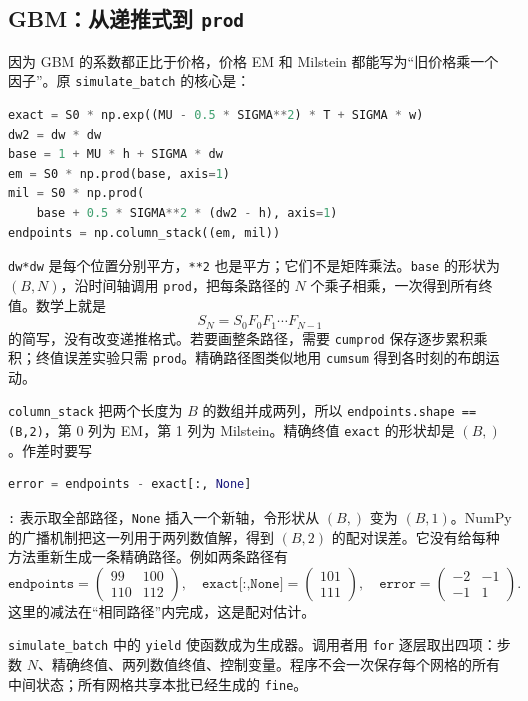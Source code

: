 \documentclass[11pt,a4paper,fontset=none]{ctexart}
\numberwithin{equation}{section}
\begin{document}
\subsection{GBM：从递推式到 \texttt{prod}}

因为 GBM 的系数都正比于价格，价格 EM 和 Milstein 都能写为“旧价格乘一个因子”。原 \texttt{simulate\_batch} 的核心是：
\begin{lstlisting}[language=Python]
exact = S0 * np.exp((MU - 0.5 * SIGMA**2) * T + SIGMA * w)
dw2 = dw * dw
base = 1 + MU * h + SIGMA * dw
em = S0 * np.prod(base, axis=1)
mil = S0 * np.prod(
    base + 0.5 * SIGMA**2 * (dw2 - h), axis=1)
endpoints = np.column_stack((em, mil))
\end{lstlisting}
\texttt{dw*dw} 是每个位置分别平方，\texttt{**2} 也是平方；它们不是矩阵乘法。\texttt{base} 的形状为 $(B,N)$，沿时间轴调用 \texttt{prod}，把每条路径的 $N$ 个乘子相乘，一次得到所有终值。数学上就是
\[
S_N=S_0F_0F_1\cdots F_{N-1}
\]
的简写，没有改变递推格式。若要画整条路径，需要 \texttt{cumprod} 保存逐步累积乘积；终值误差实验只需 \texttt{prod}。精确路径图类似地用 \texttt{cumsum} 得到各时刻的布朗运动。

\texttt{column\_stack} 把两个长度为 $B$ 的数组并成两列，所以 \texttt{endpoints.shape == (B,2)}，第 0 列为 EM，第 1 列为 Milstein。精确终值 \texttt{exact} 的形状却是 $(B,)$。作差时要写
\begin{lstlisting}[language=Python]
error = endpoints - exact[:, None]
\end{lstlisting}
\texttt{:} 表示取全部路径，\texttt{None} 插入一个新轴，令形状从 $(B,)$ 变为 $(B,1)$。NumPy 的广播机制把这一列用于两列数值解，得到 $(B,2)$ 的配对误差。它没有给每种方法重新生成一条精确路径。例如两条路径有
\[
\texttt{endpoints}=\begin{pmatrix}99&100\\110&112\end{pmatrix},
\quad \texttt{exact[:,None]}=\begin{pmatrix}101\\111\end{pmatrix},
\quad \texttt{error}=\begin{pmatrix}-2&-1\\-1&1\end{pmatrix}.
\]
这里的减法在“相同路径”内完成，这是配对估计。

\texttt{simulate\_batch} 中的 \texttt{yield} 使函数成为生成器。调用者用 \texttt{for} 逐层取出四项：步数 $N$、精确终值、两列数值终值、控制变量。程序不会一次保存每个网格的所有中间状态；所有网格共享本批已经生成的 \texttt{fine}。
\end{document}
